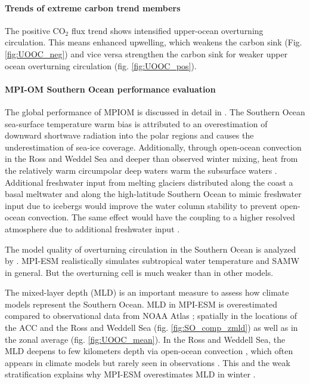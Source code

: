 \documentclass[12pt]{article}
\begin{document}
\paragraph{Trends of extreme carbon trend members}
The positive CO$_2$ flux trend shows intensified upper-ocean overturning circulation. This means enhanced upwelling, which weakens the carbon sink (Fig. \ref{fig:UOOC_neg}) and vice versa strengthen the carbon sink for weaker upper ocean overturning circulation (fig. \ref{fig:UOOC_pos}). %



\paragraph{MPI-OM Southern Ocean performance evaluation}  
The global performance of MPIOM is discussed in detail in \cite{Jungclaus2013}. The Southern Ocean sea-surface temperature warm bias is attributed to an overestimation of downward shortwave radiation into the polar regions \citep{Stevens2013} and causes the underestimation of sea-ice coverage. Additionally, through open-ocean convection in the Ross and Weddel Sea and deeper than observed winter mixing, heat from the relatively warm circumpolar deep waters warm the subsurface waters \citep{Stoessel2015}. Additional freshwater input from melting glaciers distributed along the coast a basal meltwater and along the high-latitude Southern Ocean to mimic freshwater input due to icebergs would improve the water column stability to prevent open-ocean convection. The same effect would have the coupling to a higher resolved atmosphere due to additional freshwater input \citep{Stoessel2015}. 

The model quality of overturning circulation in the Southern Ocean is analyzed by \cite{Sallee2013a}. MPI-ESM realistically simulates subtropical water temperature and SAMW in general. But the overturning cell is much weaker than in other models.

The mixed-layer depth (MLD) is an important measure to assess how climate models represent the Southern Ocean. MLD in MPI-ESM is overestimated compared to observational data from NOAA Atlas \citep{Monterey1997}; spatially in the locations of the ACC and the Ross and Weddell Sea (fig. \ref{fig:SO_comp_zmld}) as well as in the zonal average (fig. \ref{fig:UOOC_mean}). In the Ross and Weddell Sea, the MLD deepens to few kilometers depth via open-ocean convection \citep{Stoessel2015}, which often appears in climate models but rarely seen in observations \citep{Heuze2013}. This and the weak stratification explains why MPI-ESM overestimates MLD in winter \citep{Sallee2013}.
\end{document}
